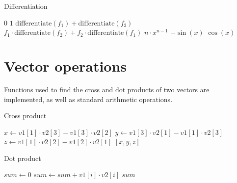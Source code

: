 \begin{algorithm}
    \caption{Differentiation}
    \begin{algorithmic}
            \State \Return $0$
            \State \Return $1$
            \State \Return $\text{differentiate}(f_1) + \text{differentiate}(f_2)$
            \State \Return $f_1 \cdot \text{differentiate}(f_2) + f_2 \cdot \text{differentiate}(f_1)$
            \State \Return $n \cdot x^{n-1}$
            \State \Return $-\sin(x)$
            \State \Return $\cos(x)$
        \EndIf

        \EndFunction
    \end{algorithmic}\label{alg:algorithm4}
\end{algorithm}

\section{Vector operations}\label{sec:vector-ops}

Functions used to find the cross and dot products of two vectors are implemented, as well as standard arithmetic
operations.

\begin{algorithm}
    \caption{Cross product}
    \begin{algorithmic}
            \State $x \gets v1[1] \cdot v2[3] - v1[3] \cdot v2[2]$
            \State $y \gets v1[3] \cdot v2[1] - v1[1] \cdot v2[3]$
            \State $z \gets v1[1] \cdot v2[2] - v1[2] \cdot v2[1]$
            \State \Return $[x, y, z]$
        \EndFunction
    \end{algorithmic}\label{alg:algorithm6}
\end{algorithm}

\begin{algorithm}
    \caption{Dot product}
    \begin{algorithmic}
            \State $sum \gets 0$
                \State $sum \gets sum + v1[i] \cdot v2[i]$
            \EndFor
            \State \Return $sum$
        \EndFunction
    \end{algorithmic}\label{alg:algorithm7}
\end{algorithm}

